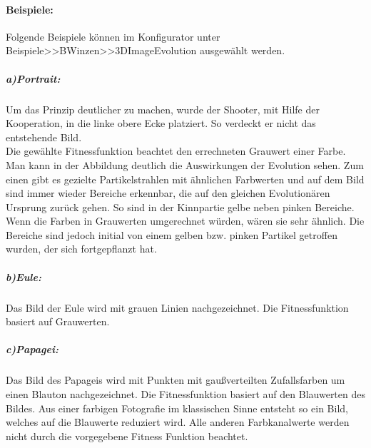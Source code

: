 \documentclass[../mciAusarbeitung.tex]{subfiles}
\begin{document}
	\paragraph{Beispiele:}
	Folgende Beispiele können im Konfigurator unter Beispiele>>BWinzen>>3DImageEvolution ausgewählt werden.
		\subparagraph{a)Portrait:} Um das Prinzip deutlicher zu machen, wurde der Shooter, mit Hilfe der Kooperation, in die linke obere Ecke platziert. So verdeckt er nicht das entstehende Bild.\\
			Die gewählte Fitnessfunktion beachtet den errechneten Grauwert einer Farbe. Man kann in der Abbildung deutlich die Auswirkungen der Evolution sehen. Zum einen gibt es gezielte Partikelstrahlen mit ähnlichen Farbwerten und auf dem Bild sind immer wieder Bereiche erkennbar, die auf den gleichen Evolutionären Ursprung zurück gehen. So sind in der Kinnpartie gelbe neben pinken Bereiche. Wenn die Farben in Grauwerten umgerechnet würden, wären sie sehr ähnlich. Die Bereiche sind jedoch initial von einem gelben bzw. pinken Partikel getroffen wurden, der sich fortgepflanzt hat.
	\subparagraph{b)Eule:}Das Bild der Eule wird mit grauen Linien nachgezeichnet. Die Fitnessfunktion basiert auf Grauwerten.
	\subparagraph{c)Papagei:} Das Bild des Papageis wird mit Punkten mit gaußverteilten Zufallsfarben um einen Blauton nachgezeichnet. Die Fitnessfunktion basiert auf den Blauwerten des Bildes. Aus einer farbigen Fotografie im klassischen Sinne entsteht so ein Bild, welches auf die Blauwerte reduziert wird. Alle anderen Farbkanalwerte werden nicht durch die vorgegebene Fitness Funktion beachtet.	
\pagebreak
\end{document}
